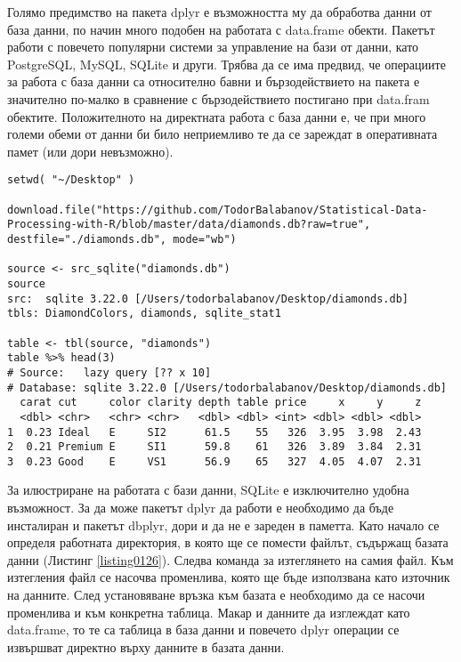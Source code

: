 Голямо предимство на пакета dplyr е възможността му да обработва данни от база данни, по начин много подобен на работата с data.frame обекти. Пакетът работи с повечето популярни системи за управление на бази от данни, като PostgreSQL, MySQL, SQLite и други. Трябва да се има предвид, че операциите за работа с база данни са относително бавни и бързодействието на пакета е значително по-малко в сравнение с бързодействието постигано при data.fram обектите. Положителното на директната работа с база данни е, че при много големи обеми от данни би било неприемливо те да се зареждат в оперативната памет (или дори невъзможно).

\begin{lstlisting}[caption=Работа с база данни, label=listing0126]
setwd( "~/Desktop" )

download.file("https://github.com/TodorBalabanov/Statistical-Data-Processing-with-R/blob/master/data/diamonds.db?raw=true", destfile="./diamonds.db", mode="wb")

source <- src_sqlite("diamonds.db")
source
src:  sqlite 3.22.0 [/Users/todorbalabanov/Desktop/diamonds.db]
tbls: DiamondColors, diamonds, sqlite_stat1

table <- tbl(source, "diamonds")
table %>% head(3)
# Source:   lazy query [?? x 10]
# Database: sqlite 3.22.0 [/Users/todorbalabanov/Desktop/diamonds.db]
  carat cut     color clarity depth table price     x     y     z
  <dbl> <chr>   <chr> <chr>   <dbl> <dbl> <int> <dbl> <dbl> <dbl>
1  0.23 Ideal   E     SI2      61.5    55   326  3.95  3.98  2.43
2  0.21 Premium E     SI1      59.8    61   326  3.89  3.84  2.31
3  0.23 Good    E     VS1      56.9    65   327  4.05  4.07  2.31
\end{lstlisting}

За илюстриране на работата с бази данни, SQLite е изключително удобна възможност. За да може пакетът dplyr да работи е необходимо да бъде инсталиран и пакетът dbplyr, дори и да не е зареден в паметта. Като начало се определя работната директория, в която ще се помести файлът, съдържащ базата данни (Листинг \ref{listing0126}). Следва команда за изтеглянето на самия файл. Към изтегления файл се насочва променлива, която ще бъде използвана като източник на данните. След установяване връзка към базата е необходимо да се насочи променлива и към конкретна таблица. Макар и данните да изглеждат като data.frame, то те са таблица в база данни и повечето dplyr операции се извършват директно върху данните в базата данни.


